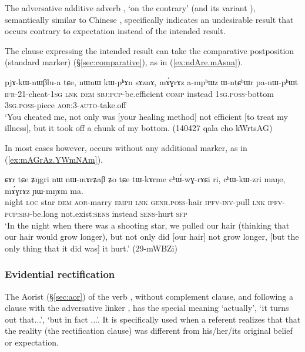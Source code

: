 The adversative additive adverb , `on the contrary' (and its variant ), semantically similar to Chinese , specifically indicates an undesirable result that occurs contrary to expectation instead of the intended result.

The clause expressing the intended result can take the comparative postposition (standard marker)  (§\ref{sec:comparative}), as in (\ref{ex:ndAre.mAsna}).

\begin{exe}
\ex \label{ex:sAznA.mAGrAZ}
\gll pjɤ-kɯ-nɯβlu-a tɕe, nɯnɯ kɯ-pʰɤn sɤznɤ, mɤ́ɣrɤz a-mpʰɯz ɯ-ntɕʰɯr pa-nɯ-pʰɯt \\
\textsc{ifr}-2\fl{}1-cheat-\textsc{1sg} \textsc{lnk} \textsc{dem} \textsc{sbj}:\textsc{pcp}-be.efficient \textsc{comp} instead \textsc{1sg}.\textsc{poss}-bottom \textsc{3sg}.\textsc{poss}-piece \textsc{aor}:3\flobv{}-\textsc{auto}-take.off \\
\glt `You cheated me, not only was [your healing method] not efficient [to treat my illness], but it took off a chunk of my bottom. (140427 qala cho kWrtsAG)
\end{exe} 

In most cases however,  occurs without any additional marker, as in (\ref{ex:mAGrAz.YWmNAm}).

\begin{exe}
\ex \label{ex:mAGrAz.YWmNAm}
\gll  ɕɤr tɕe ʑŋgri nɯ nɯ-mɤrʑaβ ʑo tɕe tɯ-kɤrme cʰɯ́-wɣ-rɤɕi ri, cʰɯ-kɯ-zri maŋe, mɤ́ɣrɤz ɲɯ-mŋɤm ma. \\
night \textsc{loc} star \textsc{dem} \textsc{aor}-marry \textsc{emph} \textsc{lnk} \textsc{genr}.\textsc{poss}-hair \textsc{ipfv}-\textsc{inv}-pull \textsc{lnk} \textsc{ipfv}-\textsc{pcp}:\textsc{sbj}-be.long not.exist:\textsc{sens} instead \textsc{sens}-hurt \textsc{sfp} \\
\glt `In the night when there was a shooting star, we pulled our hair (thinking that our hair would grow longer), but not only did [our hair] not grow longer, [but the only thing that it did was] it hurt.' (29-mWBZi)
\end{exe} 

 \subsubsection{Evidential rectification} \label{sec:evd.rectification.clauses}
 The Aorist  (§\ref{sec:aor}) of the verb ,  without complement clause, and following a clause with the adversative linker , has the special meaning `actually', `it turns out that...', `but in fact ...'. It is specifically used when a referent realizes that that the reality (the rectification clause) was different from his/her/its original belief or expectation. 

